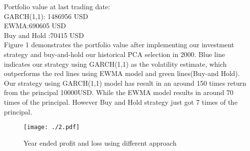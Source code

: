 \documentclass[11pts]{article}
\begin{document}
\noindent Portfolio value at last trading date: \\
GARCH(1,1):    1486956 USD\\
EWMA:690605 USD\\
Buy and Hold :70415 USD\\
Figure 1 demonstrates the  portfolio value after implementing our investment strategy and buy-and-hold our historical PCA selection in 2000. Blue line indicates our strategy using GARCH(1,1) as the volatility estimate, which outperforms the red lines using EWMA model and green lines(Buy-and Hold). Our strategy using GARCH(1,1) model has result in an around 150 times return from the principal 10000USD. While the EWMA model results in around 70 times of the principal. However Buy and Hold strategy just got 7 times of the principal.
\begin{figure}[H]
\centering
\texttt{[image: ./2.pdf]}
\caption[Fig.2]{Year ended profit and loss using different approach}
\end{figure}
\end{document}
